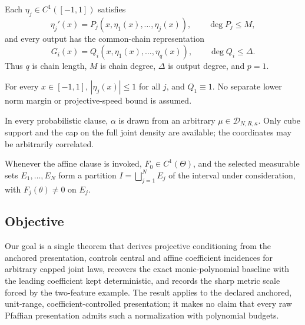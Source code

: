 \begin{assumption}
\label{assump:balcan-common-chain}
Each $\eta_j\in C^1([-1,1])$ satisfies
\[
\eta_j'(x)=P_j(x,\eta_1(x),\ldots,\eta_j(x)),
\qquad \deg P_j\leq M,
\]
and every output has the common-chain representation
\[
G_i(x)=Q_i(x,\eta_1(x),\ldots,\eta_q(x)),
\qquad \deg Q_i\leq\Delta.
\]
Thus $q$ is chain length, $M$ is chain degree, $\Delta$ is output degree,
and $p=1$.
\end{assumption}

\begin{assumption}
\label{assump:anchored-unit-range}
For every $x\in[-1,1]$, $|\eta_j(x)|\leq1$ for all $j$, and
$Q_1\equiv1$.  No separate lower norm margin or projective-speed bound is
assumed.
\end{assumption}

\begin{assumption}
\label{assump:cube-density-laws}
In every probabilistic clause, $\alpha$ is drawn from an arbitrary
$\mu\in\mathcal D_{N,R,\kappa}$.  Only cube support and the cap on the full
joint density are available; the coordinates may be arbitrarily correlated.
\end{assumption}

\begin{assumption}
\label{assump:affine-chart-data}
Whenever the affine clause is invoked, $F_0\in C^1(\Theta)$, and the selected
measurable sets $E_1,\ldots,E_N$ form a partition
$I=\bigsqcup_{j=1}^N E_j$ of the interval under consideration, with
$F_j(\theta)\neq0$ on $E_j$.
\end{assumption}

\subsection{Objective}

Our goal is a single theorem that derives projective conditioning from the
anchored presentation, controls central and affine coefficient incidences for
arbitrary capped joint laws, recovers the exact monic-polynomial baseline with
the leading coefficient kept deterministic, and records the sharp metric
scale forced by the two-feature example.  The result applies to the declared
anchored, unit-range, coefficient-controlled presentation; it makes no claim
that every raw Pfaffian presentation admits such a normalization with
polynomial budgets.

